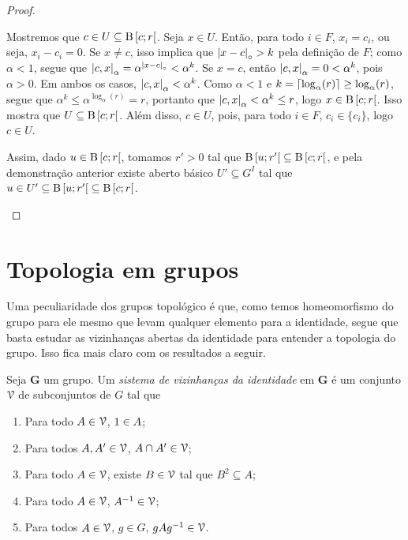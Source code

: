 \begin{proof}
\begin{itemize}
	Mostremos que $c \in U \subseteq \mathrm{B}\left[{c};{r}\right[$. Seja $x \in U$. Então, para todo $i \in F$, $x_i=c_i$, ou seja, $x_i-c_i=0$. Se $x \neq c$, isso implica que $\left\vert{x-c}\right\vert_{\circ} > k$ pela definição de $F$; como $\alpha < 1$, segue que $\left\vert{c},{x}\right\vert_\alpha = \alpha^{\left\vert{x-c}\right\vert_{\circ}} < \alpha^k$. Se $x=c$, então $\left\vert{c},{x}\right\vert_\alpha = 0 < \alpha^k$, pois $\alpha > 0$. Em ambos os casos, $\left\vert{c},{x}\right\vert_\alpha < \alpha^k$. Como $\alpha < 1$ e $k = \left\lceil{\log_{\alpha}(r)}\right\rceil \geq \log_{\alpha}(r)$, segue que $\alpha^k \leq \alpha^{\log_{\alpha}(r)} = r$, portanto que $\left\vert{c},{x}\right\vert_\alpha < \alpha^k \leq r$, logo $x \in \mathrm{B}\left[{c};{r}\right[$. Isso mostra que $U \subseteq \mathrm{B}\left[{c};{r}\right[$. Além disso, $c \in U$, pois, para todo $i \in F$, $c_i \in \{c_i\}$, logo $c \in U$.

	Assim, dado $u \in \mathrm{B}\left[{c};{r}\right[$, tomamos $r'>0$ tal que $\mathrm{B}\left[{u};{r'}\right[ \subseteq \mathrm{B}\left[{c};{r}\right[$, e pela demonstração anterior existe aberto básico $U' \subseteq G^{I}$ tal que $u \in U' \subseteq \mathrm{B}\left[{u};{r'}\right[ \subseteq \mathrm{B}\left[{c};{r}\right[$.
	\end{itemize}
\end{proof}


\section{Topologia em grupos}

Uma peculiaridade dos grupos topológico é que, como temos homeomorfismo do grupo para ele mesmo que levam qualquer elemento para a identidade, segue que basta estudar as vizinhanças abertas da identidade para entender a topologia do grupo. Isso fica mais claro com os resultados a seguir.

\begin{definition}
Seja $\bm G$ um grupo. Um \emph{sistema de vizinhanças da identidade} em $\bm G$ é um conjunto $\mathcal{V}$ de subconjuntos de $G$ tal que
	\begin{enumerate}
	\item Para todo $A \in \mathcal{V}$, $1 \in A$;
	\item Para todos $A,A' \in \mathcal{V}$, $A \cap A' \in \mathcal{V}$;
	\item Para todo $A \in \mathcal{V}$, existe $B \in \mathcal{V}$ tal que $B^2 \subseteq A$;
	\item	 Para todo $A \in \mathcal{V}$, $A^{-1} \in \mathcal{V}$;
	\item Para todos $A \in \mathcal{V}$, $g \in G$, $gAg^{-1} \in \mathcal{V}$.
	\end{enumerate}
\end{definition}

